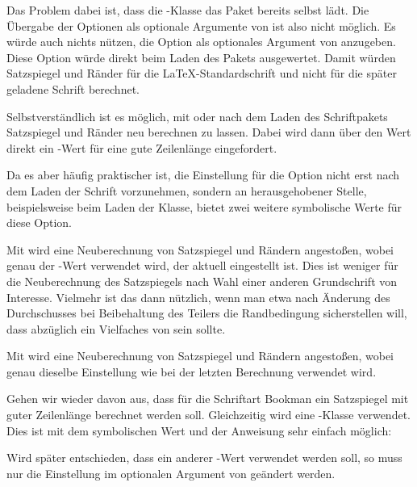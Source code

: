 \begin{Explain}
  Das Problem dabei ist, dass die \KOMAScript-Klasse das Paket
   bereits selbst lädt. Die Übergabe der Optionen als
  optionale Argumente von  ist also nicht
  möglich. Es würde auch nichts nützen, die Option  als
  optionales Argument von 
  anzugeben. Diese Option würde direkt beim Laden des Pakets
   ausgewertet. Damit würden Satzspiegel und Ränder für die
  \LaTeX-Standardschrift und nicht für die später geladene Schrift berechnet.

  Selbstverständlich ist es möglich, mit %
   oder
   nach dem Laden
  des Schriftpakets Satzspiegel und Ränder neu berechnen zu lassen. Dabei wird
  dann über den Wert  direkt ein -Wert für eine gute
  Zeilenlänge eingefordert.

  Da es aber häufig praktischer ist, die Einstellung für die Option
   nicht erst nach dem Laden der Schrift vorzunehmen, sondern an
  herausgehobener Stelle, beispielsweise beim Laden der Klasse, bietet
   zwei weitere symbolische Werte für diese Option.
\end{Explain}

Mit %
 wird eine Neuberechnung von Satzspiegel
und Rändern angestoßen, wobei genau der -Wert verwendet wird, der
aktuell eingestellt ist. Dies ist weniger für die Neuberechnung des
Satzspiegels nach Wahl einer anderen Grundschrift von Interesse. Vielmehr ist
das dann nützlich, wenn man etwa nach Änderung des Durchschusses bei
Beibehaltung des Teilers  die Randbedingung sicherstellen will, dass
 abzüglich  ein Vielfaches von
 sein sollte.

Mit %
 wird eine Neuberechnung von Satzspiegel
und Rändern angestoßen, wobei genau dieselbe Einstellung wie bei der letzten
Berechnung verwendet wird.

\begin{Example}
  Gehen wir wieder davon aus, dass für die Schriftart Bookman ein Satzspiegel
  mit guter Zeilenlänge berechnet werden soll.  Gleichzeitig wird eine
  \KOMAScript-Klasse verwendet. Dies ist mit dem symbolischen Wert
   und der Anweisung  sehr
  einfach möglich:
  Wird später entschieden, dass ein anderer -Wert
  verwendet werden soll, so muss nur die Einstellung im optionalen Argument
  von  geändert werden.
\end{Example}

